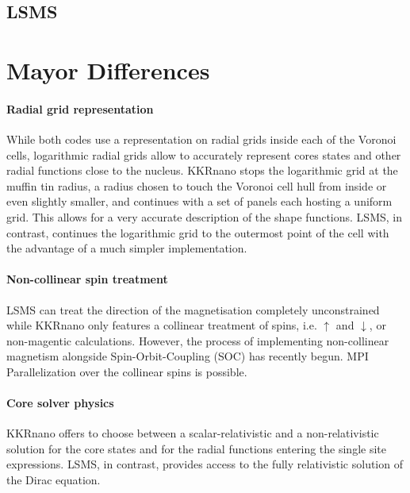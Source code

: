 \documentclass{llncs}
\def\KKRnano{{KKRnano}}
\def\LSMS{{LSMS}}
\begin{document}
\subsection{LSMS} \label{section:lsms}


\section{Mayor Differences} \label{section:differ}

\paragraph{Radial grid representation}
While both codes use a representation on radial grids inside each of the Voronoi cells,
logarithmic radial grids allow to accurately represent cores states and other radial functions
close to the nucleus. \KKRnano{} stops the logarithmic grid at the muffin tin radius,
a radius chosen to touch the Voronoi cell hull from inside or even slightly smaller, and 
continues with a set of panels each hosting a uniform grid. This allows for a very accurate
description of the shape functions. \LSMS{}, in contrast, continues the logarithmic grid
to the outermost point of the cell with the advantage of a much simpler implementation.

\paragraph{Non-collinear spin treatment}
\LSMS{} can treat the direction of the magnetisation completely unconstrained
while \KKRnano{} only features a collinear treatment of spins, i.e. $\uparrow$ and $\downarrow$, 
or non-magentic calculations. However, the process of implementing non-collinear
magnetism alongside Spin-Orbit-Coupling (SOC) has recently begun.
MPI Parallelization over the collinear spins is possible.

\paragraph{Core solver physics}
\KKRnano{} offers to choose between a scalar-relativistic and a non-relativistic solution for the core states 
and for the radial functions entering the single site expressions. 
\LSMS{}, in contrast, provides access to the fully relativistic solution of the Dirac equation.
%
\end{document}
